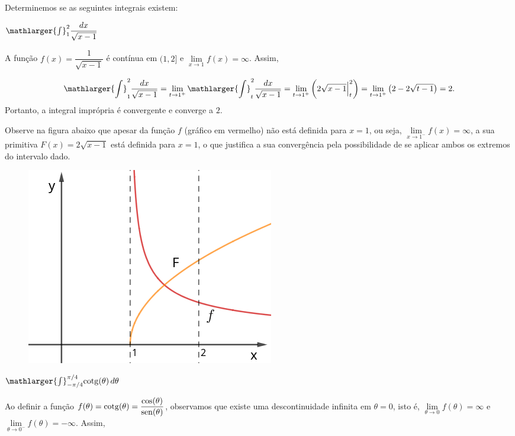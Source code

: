 \cleardoublepage\documentclass[../main.tex]{subfiles}
\begin{document}
\begin{ex}
Determinemos se as seguintes integrais existem:
\begin{compactenum}[a)]
\item \(\mathlarger{\int}^{2}_{1} \dfrac{dx}{\sqrt{x-1}}\)

\begin{solution}
A função \(f(x)= \dfrac{1}{\sqrt{x-1}}\) é contínua em \((1,2]\) e \(\lim\limits_{x\to 1^{}}f(x)=\infty\). Assim,

\[ \mathlarger{\int}^{2}_{1} \dfrac{dx}{\sqrt{x-1}} = \lim\limits_{t\to 1^{+}}\mathlarger{\int}^{2}_{t} \dfrac{dx}{\sqrt{x-1}} = \lim\limits_{t\to 1^{+}}\left( 2\sqrt{x-1} \Big{|}^{2}_{t}\right) = \lim\limits_{t\to 1^{+}}\left( 2 - 2\sqrt{t-1} \right)=2. \]
Portanto, a integral imprópria é convergente e converge a \(2\).

Observe na figura abaixo que apesar da função $f$ (gráfico em vermelho) não está definida para $x=1$, ou seja, \(\lim\limits_{x\to 1^{-}}f(x)=\infty\), a sua primitiva $F(x)=2\sqrt{x-1}$ está definida para $x=1$, o que justifica  a sua  convergência pela possibilidade de se aplicar ambos os extremos do intervalo dado.
\end{solution}
\begin{figure}[htb]
    \centering
    \includegraphics[scale=0.7]{figs/IntImpExConverge.png}
    \label{fig:IntImpExConverge}
\end{figure}
\item \(\mathlarger{\int}^{\pi/4}_{-\pi/4} {\rm cotg} (\theta) \,d\theta\)

\begin{solution}
Ao definir a função \(f(\theta)={\rm cotg}(\theta) =\dfrac{\cos( \theta)}{{\rm sen}(\theta)}\), observamos que existe uma descontinuidade infinita em \(\theta=0\), isto é, \(\lim\limits_{\theta\to 0^{}}f(\theta)=\infty\) e \(\lim\limits_{\theta\to 0^{-}}f(\theta)=-\infty\). Assim,


\end{solution}
\end{compactenum}
\end{ex}
\end{document}
